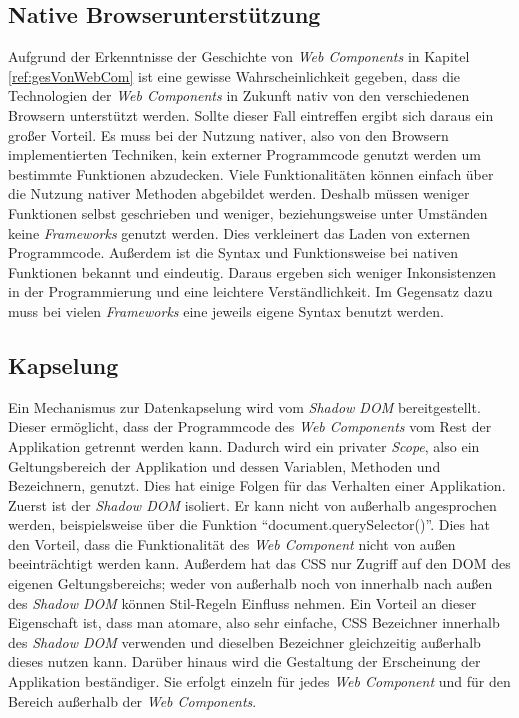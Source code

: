 \documentclass[12pt, paper=a4, bibtotoc, toc=listof, headsepline=true]{scrreprt}
\begin{document}
			\subsection{Native Browserunterstützung}
			Aufgrund der Erkenntnisse der Geschichte von \emph{Web Components} in Kapitel \ref{ref:gesVonWebCom} ist eine gewisse Wahrscheinlichkeit gegeben, dass die Technologien der \emph{Web Components} in Zukunft nativ von den verschiedenen Browsern unterstützt werden.
			Sollte dieser Fall eintreffen ergibt sich daraus ein großer Vorteil. Es muss bei der Nutzung nativer, also von den Browsern implementierten Techniken, kein externer Programmcode genutzt werden um bestimmte Funktionen abzudecken. Viele Funktionalitäten können einfach über die Nutzung nativer Methoden abgebildet werden. Deshalb müssen weniger Funktionen selbst geschrieben und weniger, beziehungsweise unter Umständen keine \emph{Frameworks} genutzt werden. Dies verkleinert das Laden von externen Programmcode. Außerdem ist die Syntax und Funktionsweise bei nativen Funktionen bekannt und eindeutig. Daraus ergeben sich weniger Inkonsistenzen in der Programmierung und eine leichtere Verständlichkeit. Im Gegensatz dazu muss bei vielen \emph{Frameworks} eine jeweils eigene Syntax benutzt werden.
			\subsection{Kapselung}
			Ein Mechanismus zur Datenkapselung wird vom \emph{Shadow DOM} bereitgestellt.
			Dieser ermöglicht, dass der Programmcode des \emph{Web Components} vom Rest der Applikation getrennt werden kann. Dadurch wird ein privater \emph{Scope}, also ein Geltungsbereich der Applikation und dessen Variablen, Methoden und Bezeichnern, genutzt\cite[S.2]{patel2015learning}. Dies hat einige Folgen für das Verhalten einer Applikation. Zuerst ist der \emph{Shadow \ac{DOM}} isoliert. Er kann nicht von außerhalb angesprochen werden, beispielsweise über die Funktion \enquote{document.querySelector()}. Dies hat den Vorteil, dass die Funktionalität des \emph{Web Component} nicht von außen beeinträchtigt werden kann. Außerdem hat das \ac{CSS} nur Zugriff auf den \ac{DOM} des eigenen Geltungsbereichs; weder von außerhalb noch von innerhalb nach außen des \emph{Shadow \ac{DOM}} können Stil-Regeln Einfluss nehmen. Ein Vorteil an dieser Eigenschaft ist, dass man atomare, also sehr einfache, \ac{CSS} Bezeichner innerhalb des \emph{Shadow \ac{DOM}} verwenden und dieselben Bezeichner gleichzeitig außerhalb dieses nutzen kann\cite{Bidelman2016}. Darüber hinaus wird die Gestaltung der Erscheinung der Applikation beständiger. Sie erfolgt einzeln für jedes \emph{Web Component} und für den Bereich außerhalb der \emph{Web Components}.
\end{document}

